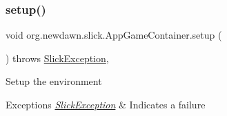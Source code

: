 \subsubsection{\texorpdfstring{setup()}{setup()}}
{\footnotesize\ttfamily void org.\+newdawn.\+slick.\+App\+Game\+Container.\+setup (\begin{DoxyParamCaption}{ }\end{DoxyParamCaption}) throws \mbox{\hyperlink{classorg_1_1newdawn_1_1slick_1_1_slick_exception}{Slick\+Exception}}\hspace{0.3cm}{\ttfamily [inline]}, {\ttfamily [protected]}}

Setup the environment


\begin{DoxyExceptions}{Exceptions}
{\em \mbox{\hyperlink{classorg_1_1newdawn_1_1slick_1_1_slick_exception}{Slick\+Exception}}} & Indicates a failure \\
\hline
\end{DoxyExceptions}

